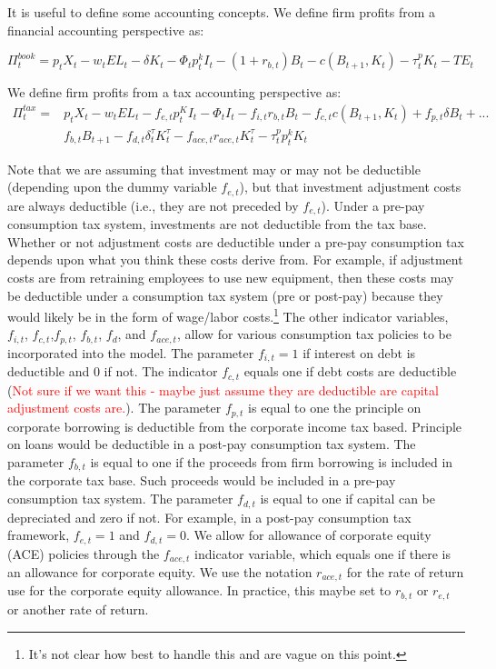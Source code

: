 It is useful to define some accounting concepts.  We define firm profits from a financial accounting perspective as:

\begin{equation}
\label{eqn:profit_book}
\Pi^{book}_{t} = p_{t}X_{t}-w_{t}EL_{t}-\delta K_{t} -\Phi_{t}p^{k}_{t}I_{t}-(1+r_{b,t})B_{t}- c(B_{t+1},K_{t})-\tau^{p}_{t}K_{t}-TE_{t}
\end{equation}

We define firm profits from a tax accounting perspective as:
\begin{equation}
\label{eqn:profit_tax}
\begin{split}
\Pi^{tax}_{t}= & p_{t}X_{t}-w_{t}EL_{t}-f_{e,t}p^{K}_{t}I_{t}-\Phi_{t}I_{t}-f_{i,t}r_{b,t}B_{t}-f_{c,t}c(B_{t+1},K_{t})+f_{p,t}\delta B_{t}+...\\
& f_{b,t}B_{t+1}-f_{d,t}\delta^{\tau}_{t}K^{\tau}_{t}-f_{ace,t}r_{ace,t}K^{\tau}_{t}-\tau^{p}_{t}p^{k}_{t}K_{t}
\end{split}
\end{equation}

\noindent\noindent Note that we are assuming that investment may or may not be deductible (depending upon the dummy variable $f_{e,t}$), but that investment adjustment costs are always deductible (i.e., they are not preceded by $f_{e,t}$).  Under a pre-pay consumption tax system, investments are not deductible from the tax base.  Whether or not adjustment costs are deductible under a pre-pay consumption tax depends upon what you think these costs derive from.  For example, if adjustment costs are from retraining employees to use new equipment, then these costs may be deductible under a consumption tax system (pre or post-pay) because they would likely be in the form of wage/labor costs.\footnote{It's not clear how best to handle this and \citet{DZ2013} are vague on this point.}  The other indicator variables, $f_{i,t}$, $f_{c,t}$,$f_{p,t}$, $f_{b,t}$, $f_{d}$, and $f_{ace,t}$, allow for various consumption tax policies to be incorporated into the model.  The parameter $f_{i,t}=1$ if interest on debt is deductible and 0 if not.  The indicator $f_{c,t}$ equals one if debt costs are deductible (\textcolor{red}{Not sure if we want this - maybe just assume they are deductible are capital adjustment costs are.}).  The parameter $f_{p,t}$ is equal to one the principle on corporate borrowing is deductible from the corporate income tax based.  Principle on loans would be deductible in a post-pay consumption tax system.  The parameter $f_{b,t}$ is equal to one if the proceeds from firm borrowing is included in the corporate tax base.  Such proceeds would be included in a pre-pay consumption tax system.  The parameter $f_{d,t}$ is equal to one if capital can be depreciated and zero if not.  For example, in a post-pay consumption tax framework, $f_{e,t}=1$ and $f_{d,t}=0$. We allow for allowance of corporate equity (ACE) policies through the $f_{ace,t}$ indicator variable, which equals one if there is an allowance for corporate equity.  We use the notation $r_{ace,t}$ for the rate of return use for the corporate equity allowance.  In practice, this maybe set to $r_{b,t}$ or $r_{e,t}$ or another rate of return. 

